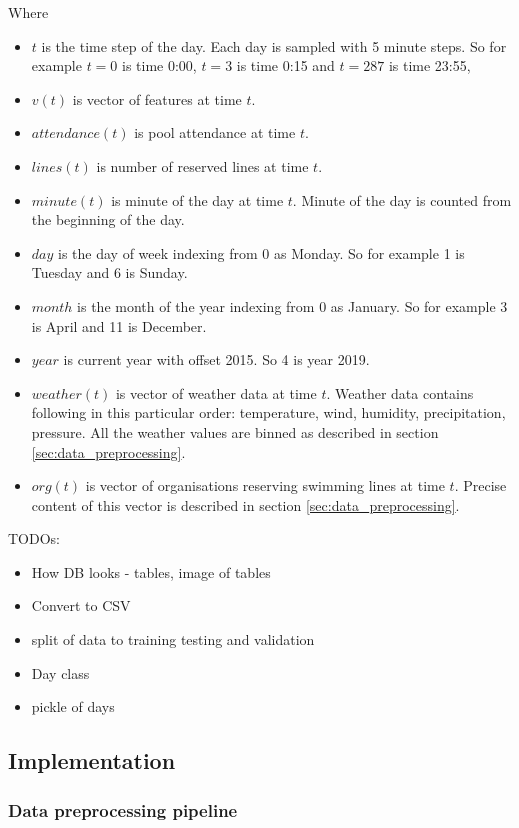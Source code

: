 \documentclass{article}
\begin{document}
Where 
\begin{itemize}
    \item $t$ is the time step of the day. Each day is sampled with 5 minute steps. So for example $t = 0$ is time 0:00, $t = 3$ is time 0:15 and $t = 287$ is time 23:55, 
    \item $v(t)$ is vector of features at time $t$.
    \item $attendance(t)$ is pool attendance at time $t$.
    \item $lines(t)$ is number of reserved lines at time $t$.
    \item $minute(t)$ is minute of the day at time $t$. Minute of the day is counted from the beginning of the day.
    \item $day$ is the day of week indexing from 0 as Monday. So for example 1 is Tuesday and 6 is Sunday.
    \item $month$ is the month of the year indexing from 0 as January. So for example 3 is April and 11 is December.
    \item $year$ is current year with offset 2015. So 4 is year 2019.
    \item $weather(t)$ is vector of weather data at time $t$. Weather data contains following in this particular order: temperature, wind, humidity, precipitation, pressure. All the weather values are binned as described in section \ref{sec:data_preprocessing}.
    \item $org(t)$ is  vector of organisations reserving swimming lines at time $t$. Precise content of this vector is described in section \ref{sec:data_preprocessing}.
\end{itemize}
 
\color{red}
TODOs:
\begin{itemize}
    \item How DB looks - tables, image of tables
    \item Convert to CSV
    \item split of data to training testing and validation
    \item Day class 
    \item pickle of days
\end{itemize}
\color{black}

\subsection{Implementation}
\subsubsection{Data preprocessing pipeline}
\end{document}
